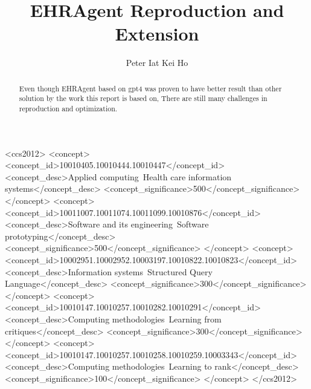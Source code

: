 \documentclass[screen,review]{acmart}
\begin{document}
\title{EHRAgent Reproduction and Extension}

\author{Peter Iat Kei Ho}

\renewcommand{\shortauthors}{Peter Ho}

\begin{abstract}
  Even though EHRAgent based on gpt4 was proven to have better result 
  than other solution by the work this report is based on, There are 
  still many challenges in reproduction and optimization.
\end{abstract}

\begin{CCSXML}
  <ccs2012>
     <concept>
         <concept_id>10010405.10010444.10010447</concept_id>
         <concept_desc>Applied computing~Health care information systems</concept_desc>
         <concept_significance>500</concept_significance>
         </concept>
     <concept>
         <concept_id>10011007.10011074.10011099.10010876</concept_id>
         <concept_desc>Software and its engineering~Software prototyping</concept_desc>
         <concept_significance>500</concept_significance>
         </concept>
     <concept>
         <concept_id>10002951.10002952.10003197.10010822.10010823</concept_id>
         <concept_desc>Information systems~Structured Query Language</concept_desc>
         <concept_significance>300</concept_significance>
         </concept>
     <concept>
         <concept_id>10010147.10010257.10010282.10010291</concept_id>
         <concept_desc>Computing methodologies~Learning from critiques</concept_desc>
         <concept_significance>300</concept_significance>
         </concept>
     <concept>
         <concept_id>10010147.10010257.10010258.10010259.10003343</concept_id>
         <concept_desc>Computing methodologies~Learning to rank</concept_desc>
         <concept_significance>100</concept_significance>
         </concept>
   </ccs2012>
\end{CCSXML}
  

\end{document}
